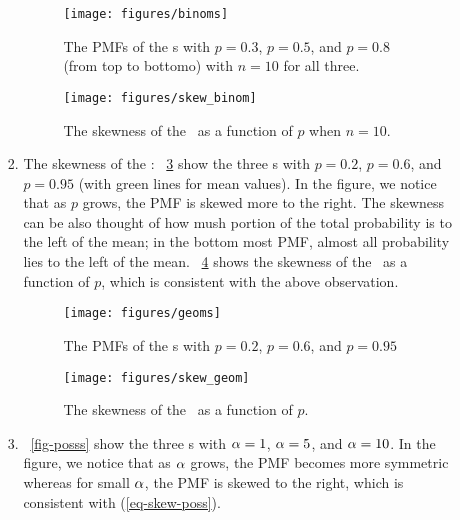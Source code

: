 \begin{enumerate}
\begin{enumerate}
\begin{solution}
\begin{enumerate}
			\begin{figure}\begin{center}
			\texttt{[image: figures/binoms]}
			\caption{The PMFs of the \binomrv s with
			$p=0.3$, $p=0.5$, and $p=0.8$ (from top to bottomo)
			with $n=10$ for all three.}
			\label{fig-binoms}
			\end{center}\end{figure}

			\begin{figure}\begin{center}
			\texttt{[image: figures/skew\_binom]}
			\caption{The skewness of the \binomrv\ as a function of $p$ when $n=10$.}
			\label{fig-skew-binom}
			\end{center}\end{figure}


			\item The skewness of the \geomrv:
			\figurename~\ref{fig-geoms}
			show the three \geomrv s
			with $p=0.2$, $p=0.6$, and $p=0.95$
			(with green lines for mean values).
			In the figure,
			we notice that
			as $p$ grows,
			the PMF is skewed more to the right.
			The skewness can be also thought
			of how mush portion of the total probability
			is to the left of the mean;
			in the bottom most PMF,
			almost all probability lies to the left of the mean.
			\figurename~\ref{fig-skew-geom}
			shows the skewness of the \geomrv\
			as a function of $p$,
			which is consistent with the above observation.

			\begin{figure}\begin{center}
			\texttt{[image: figures/geoms]}
			\caption{The PMFs of the \binomrv s with
			$p=0.2$, $p=0.6$, and $p=0.95$}
			\label{fig-geoms}
			\end{center}\end{figure}

			\begin{figure}\begin{center}
			\texttt{[image: figures/skew\_geom]}
			\caption{The skewness of the \geomrv\ as a function of $p$.}
			\label{fig-skew-geom}
			\end{center}\end{figure}


			\item
			\figurename~\ref{fig-posss}
			show the three \possrv s
			with $\alpha=1$, $\alpha=5$, and $\alpha=10$.
			In the figure,
			we notice that
			as $\alpha$ grows,
			the PMF becomes more symmetric
			whereas for small $\alpha$,
			the PMF is skewed to the right,
			which is consistent
			with (\ref{eq-skew-poss}).


\end{enumerate}
\end{solution}
\end{enumerate}
\end{enumerate}

